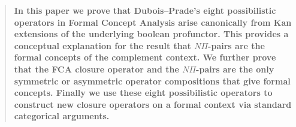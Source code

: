 
\begin{abstract}
    \textbf{In this paper we prove that Dubois--Prade's eight possibilistic operators in Formal Concept Analysis arise canonically from Kan extensions of the underlying boolean profunctor. This provides a conceptual explanation for the result that $N\Pi$-pairs are the formal concepts of the complement context. We further prove that the FCA closure operator and the $N\Pi$-pairs are the only symmetric or asymmetric operator compositions that give formal concepts. Finally we use these eight possibilistic operators to construct new closure operators on a formal context via standard categorical arguments.} 
\end{abstract}